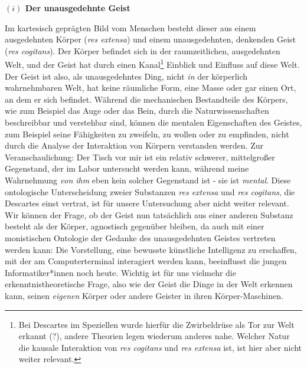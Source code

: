 \documentclass[a4paper, 12pt]{article}
\begin{document}
\begin{onehalfspace}
\vspace{5mm}
\noindent\textbf{$(i)$ Der unausgedehnte Geist}



\noindent Im kartesisch geprägten Bild vom Menschen besteht dieser aus einem ausgedehnten Körper (\emph{res extensa}) und einem unausgedehnten, denkenden Geist (\emph{res cogitans}). Der Körper befindet sich in der raumzeitlichen, ausgedehnten Welt, und der Geist hat durch einen Kanal\footnote{Bei Descartes im Speziellen wurde hierfür die Zwirbeldrüse als Tor zur Welt erkannt (?), andere Theorien legen wiederum anderes nahe. Welcher Natur die kausale Interaktion von \emph{res cogitans} und \emph{res extensa} ist, ist hier aber nicht weiter relevant.} Einblick und Einfluss auf diese Welt. Der Geist ist also, als unausgedehntes Ding, nicht \emph{in} der körperlich wahrnehmbaren Welt, hat keine räumliche Form, eine Masse oder gar einen Ort, an dem er sich befindet. Während die mechanischen Bestandteile des Körpers, wie zum Beispiel das Auge oder das Bein, durch die Naturwissenschaften beschreibbar und verstehbar sind, können die mentalen Eigenschaften des Geistes, zum Beispiel seine Fähigkeiten zu zweifeln, zu wollen oder zu empfinden, nicht durch die Analyse der Interaktion von Körpern verstanden werden. Zur Veranschaulichung:  Der Tisch vor mir ist ein relativ schwerer, mittelgroßer Gegenstand, der im Labor untersucht werden kann, während meine Wahrnehmung \emph{von ihm} eben kein solcher Gegenstand ist - sie ist \emph{mental}. Diese ontologische Unterscheidung zweier Substanzen \emph{res extensa} und \emph{res cogitans}, die Descartes einst vertrat, ist für unsere Untersuchung aber nicht weiter relevant. Wir können der Frage, ob der Geist nun tatsächlich aus einer anderen Substanz besteht als der Körper, agnostisch gegenüber bleiben, da auch mit einer monistischen Ontologie der Gedanke des unausgedehnten Geistes vertreten werden kann: Die Vorstellung, eine bewusste künstliche Intelligenz zu erschaffen, mit der am Computerterminal interagiert werden kann, beeinflusst die jungen Informatiker*innen noch heute. Wichtig ist für uns vielmehr die erkenntnistheoretische Frage, also wie der Geist die Dinge in der Welt erkennen kann, seinen \emph{eigenen} Körper oder andere Geister in ihren Körper-Maschinen.


\end{onehalfspace}
\end{document}
